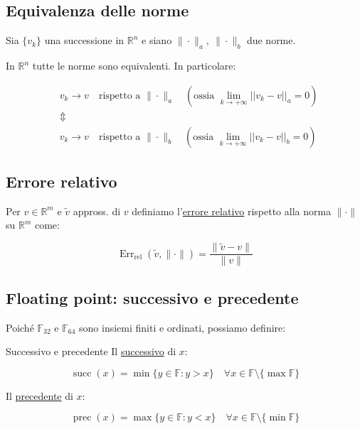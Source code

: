 \documentclass{article}
\begin{document}
\subsection{Equivalenza delle norme}

Sia $\{v_k\}$ una successione in $\mathbb{R}^n$ e siano $\|\cdot\|_a,\ \|\cdot\|_b$ due norme.

In $\mathbb{R}^n$ tutte le norme sono equivalenti. In particolare:


\begin{align*}
     & v_k\longrightarrow v
    \quad\text{rispetto a }\|\cdot\|_a\quad\left(\text{ossia } \lim_{k\to+\infty}||v_k-v||_a=0\right) \\
     & \Updownarrow                                                                                   \\
     & v_k\longrightarrow v
    \quad\text{rispetto a }\|\cdot\|_b\quad\left(\text{ossia } \lim_{k\to+\infty}||v_k-v||_b=0\right)
\end{align*}


\subsection{Errore relativo}
Per $v\in\mathbb R^m$ e $\tilde{v}$ appross. di $v$ definiamo l'\underline{errore relativo} rispetto alla norma $\|\cdot\|$ su $\mathbb R^m$ come:

$$
    \boxed{
        \operatorname{Err}_{\text{rel}}(\widetilde{v},\|\cdot\|)
        =
        \frac{\|\widetilde{v}-v\|}{\|v\|}
    }
$$

\subsection{Floating point: successivo e precedente}

Poiché $\mathbb{F}_{32}$ e $\mathbb{F}_{64}$ sono insiemi finiti e ordinati, possiamo definire:

\begin{defi}{Successivo e precedente}{}
    Il \underline{successivo} di $x$:

    $$
        \operatorname{succ}(x)
        =
        \min\{y\in\mathbb{F}:y>x\}\quad \forall x\in\mathbb F \setminus\{\max\mathbb F\}
    $$

    Il \underline{precedente} di $x$:

    $$
        \operatorname{prec}(x)
        =
        \max\{y\in\mathbb{F}:y<x\}\quad \forall x\in\mathbb F \setminus\{\min\mathbb F\}
    $$
\end{defi}
\end{document}
